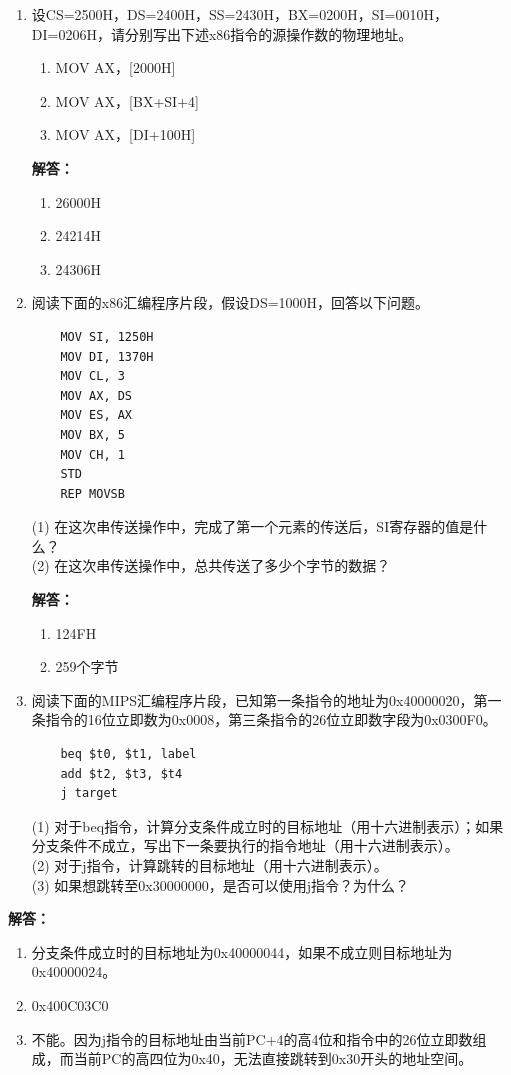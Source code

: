 \documentclass[12pt,a4paper]{article}
\begin{document}
\begin{enumerate}
    \item 设CS=2500H，DS=2400H，SS=2430H，BX=0200H，SI=0010H，DI=0206H，请分别写出下述x86指令的源操作数的物理地址。
    \begin{enumerate}
        \item MOV AX，[2000H]
        \item MOV AX，[BX+SI+4]
        \item MOV AX，[DI+100H]
    \end{enumerate}

    \textbf{解答：}

    \begin{enumerate}
            \item 26000H
            \item 24214H
            \item 24306H
    \end{enumerate}

    \item 阅读下面的x86汇编程序片段，假设DS=1000H，回答以下问题。
    \begin{verbatim}
    MOV SI, 1250H 
    MOV DI, 1370H 
    MOV CL, 3 
    MOV AX, DS 
    MOV ES, AX 
    MOV BX, 5 
    MOV CH, 1
    STD 
    REP MOVSB
    \end{verbatim}
    (1) 在这次串传送操作中，完成了第一个元素的传送后，SI寄存器的值是什么？ \\
    (2) 在这次串传送操作中，总共传送了多少个字节的数据？

    \textbf{解答：}

    \begin{enumerate}
        \item[(1)] 124FH
        \item[(2)] 259个字节
    \end{enumerate}

    \item 阅读下面的MIPS汇编程序片段，已知第一条指令的地址为0x40000020，第一条指令的16位立即数为0x0008，第三条指令的26位立即数字段为0x0300F0。
    \begin{verbatim}
    beq $t0, $t1, label
    add $t2, $t3, $t4
    j target
    \end{verbatim}
    (1) 对于beq指令，计算分支条件成立时的目标地址（用十六进制表示）；如果分支条件不成立，写出下一条要执行的指令地址（用十六进制表示）。 \\
    (2) 对于j指令，计算跳转的目标地址（用十六进制表示）。 \\
    (3) 如果想跳转至0x30000000，是否可以使用j指令？为什么？
\end{enumerate}

\textbf{解答：}
    \begin{enumerate}
        \item[(1)] 分支条件成立时的目标地址为0x40000044，如果不成立则目标地址为0x40000024。
        \item[(2)] 0x400C03C0
        \item[(3)] 不能。因为j指令的目标地址由当前PC+4的高4位和指令中的26位立即数组成，而当前PC的高四位为0x40，无法直接跳转到0x30开头的地址空间。
    \end{enumerate}
\end{document}
